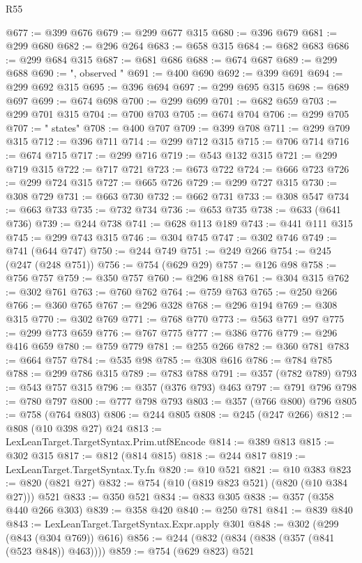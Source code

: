 \begin{lexlean}{R55}
\begin{coremodule}
@677 := @399 @676
@679 := @299 @677 @315
@680 := @396 @679
@681 := @299 @680
@682 := @296 @264
@683 := @658 @315
@684 := @682 @683
@686 := @299 @684 @315
@687 := @681 @686
@688 := @674 @687
@689 := @299 @688
@690 := ", observed "
@691 := @400 @690
@692 := @399 @691
@694 := @299 @692 @315
@695 := @396 @694
@697 := @299 @695 @315
@698 := @689 @697
@699 := @674 @698
@700 := @299 @699
@701 := @682 @659
@703 := @299 @701 @315
@704 := @700 @703
@705 := @674 @704
@706 := @299 @705
@707 := " states"
@708 := @400 @707
@709 := @399 @708
@711 := @299 @709 @315
@712 := @396 @711
@714 := @299 @712 @315
@715 := @706 @714
@716 := @674 @715
@717 := @299 @716
@719 := @543 @132 @315
@721 := @299 @719 @315
@722 := @717 @721
@723 := @673 @722
@724 := @666 @723
@726 := @299 @724 @315
@727 := @665 @726
@729 := @299 @727 @315
@730 := @308 @729
@731 := @663 @730
@732 := @662 @731
@733 := @308 @547
@734 := @663 @733
@735 := @732 @734
@736 := @653 @735
@738 := @633 (@641 @736)
@739 := @244 @738
@741 := @628 @113 @189
@743 := @441 @111 @315
@745 := @299 @743 @315
@746 := @304 @745
@747 := @302 @746
@749 := @741 (@644 @747)
@750 := @244 @749
@751 := @249 @266
@754 := @245 (@247 (@248 @751))
@756 := @754 (@629 @29)
@757 := @126 @98
@758 := @756 @757
@759 := @350 @757
@760 := @296 @188
@761 := @304 @315
@762 := @302 @761
@763 := @760 @762
@764 := @759 @763
@765 := @250 @266
@766 := @360 @765
@767 := @296 @328
@768 := @296 @194
@769 := @308 @315
@770 := @302 @769
@771 := @768 @770
@773 := @563 @771 @97
@775 := @299 @773 @659
@776 := @767 @775
@777 := @386 @776
@779 := @296 @416 @659
@780 := @759 @779
@781 := @255 @266
@782 := @360 @781
@783 := @664 @757
@784 := @535 @98
@785 := @308 @616
@786 := @784 @785
@788 := @299 @786 @315
@789 := @783 @788
@791 := @357 (@782 @789)
@793 := @543 @757 @315
@796 := @357 (@376 @793) @463
@797 := @791 @796
@798 := @780 @797
@800 := @777 @798 @793
@803 := @357 (@766 @800) @796
@805 := @758 (@764 @803)
@806 := @244 @805
@808 := @245 (@247 @266)
@812 := @808 (@10 @398 @27) @24
@813 := LexLeanTarget.TargetSyntax.Prim.utf8Encode
@814 := @389 @813
@815 := @302 @315
@817 := @812 (@814 @815)
@818 := @244 @817
@819 := LexLeanTarget.TargetSyntax.Ty.fn
@820 := @10 @521
@821 := @10 @383
@823 := @820 (@821 @27)
@832 := @754 (@10 (@819 @823 @521) (@820 (@10 @384 @27))) @521
@833 := @350 @521
@834 := @833 @305
@838 := @357 (@358 @440 @266 @303)
@839 := @358 @420
@840 := @250 @781
@841 := @839 @840
@843 := LexLeanTarget.TargetSyntax.Expr.apply @301
@848 := @302 (@299 (@843 (@304 @769)) @616)
@856 := @244 (@832 (@834 (@838 (@357 (@841 (@523 @848)) @463))))
@859 := @754 (@629 @823) @521

\end{coremodule}
\end{lexlean}

